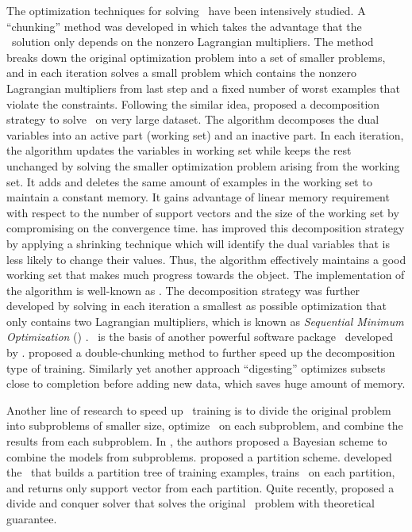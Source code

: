 {%
The optimization techniques for solving \svm\ have been intensively studied.
A ``chunking'' method was developed in \citep{Vapnik82estimation} which takes the advantage that the \svm\ solution only depends on the nonzero Lagrangian multipliers.
The method breaks down the original optimization problem into a set of smaller problems, and in each iteration solves a small problem which contains the nonzero Lagrangian multipliers from last step and a fixed number of worst examples that violate the constraints.
Following the similar idea, \citet{Osuna97an} proposed a decomposition strategy to solve \svm\ on very large dataset.
The algorithm decomposes the dual variables into an active part (working set) and an inactive part.
In each iteration, the algorithm updates the variables in working set while keeps the rest unchanged by solving the smaller optimization problem arising from the working set.
It adds and deletes the same amount of examples in the working set to maintain a constant memory.
It gains advantage of linear memory requirement with respect to the number of support vectors and the size of the working set by compromising on the convergence time.
\citet{Joachims98making} has improved this decomposition strategy by applying a shrinking technique which will identify the dual variables that is less likely to change their values.
Thus, the algorithm effectively maintains a good working set that makes much progress towards the object.
The implementation of the algorithm is well-known as \svmlight.
The decomposition strategy was further developed by solving in each iteration a smallest as possible optimization that only contains two Lagrangian multipliers, which is known as \textit{Sequential Minimum Optimization} (\smo) \citep{Platt98sequential,Platt99fast}.
\smo\ is the basis of another powerful software package \libsvm\ developed by \citet{Chang11libsvm}.
\citet{Perezcruz04double} proposed a double-chunking method to further speed up the decomposition type of training. 
Similarly yet another approach ``digesting'' \citep{Decoste02support} optimizes subsets close to completion before adding new data, which saves huge amount of memory.

Another line of research to speed up \svm\ training is to divide the original problem into subproblems of smaller size, optimize \svm\ on each subproblem, and combine the results from each subproblem.
In \citep{Tresp00a,Schwaighofer01the}, the authors proposed a Bayesian scheme to combine the models from subproblems.
\citet{Collobert02a} proposed a partition scheme.
\citet{Graf05parallel} developed the \svmcascade\ that builds a partition tree of training examples, trains \svm\ on each partition, and returns only support vector from each partition.
Quite recently, \citet{Hsieh14a} proposed a divide and conquer solver that solves the original \svm\ problem with theoretical guarantee.

}
